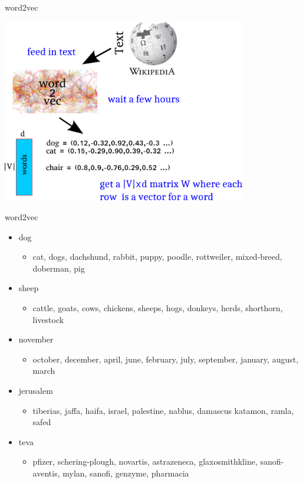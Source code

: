 \documentclass[compress]{beamer}
\begin{document}
\begin{frame}{word2vec}

    \centering
    \includegraphics[width=0.8\textwidth]{distsim/w2v_flow.png}

\end{frame}

\begin{frame}{word2vec}

    \begin{itemize}
        \item dog
            \begin{itemize}
                \item cat, dogs, dachshund, rabbit, puppy, poodle, rottweiler,
                    mixed-breed, doberman, pig
            \end{itemize}
        \item sheep
            \begin{itemize}
                \item cattle, goats, cows, chickens, sheeps, hogs, donkeys,
                    herds, shorthorn, livestock
            \end{itemize}
        \item november
            \begin{itemize}
                \item october, december, april, june, february, july, september,
                    january, august, march
            \end{itemize}
        \item jerusalem
            \begin{itemize}
                \item tiberias, jaffa, haifa, israel, palestine, nablus, damascus
                    katamon, ramla, safed
            \end{itemize}
        \item teva
            \begin{itemize}
                \item pfizer, schering-plough, novartis, astrazeneca,
                    glaxosmithkline, sanofi-aventis, mylan, sanofi, genzyme, pharmacia
            \end{itemize}
    \end{itemize}
\end{frame}
\end{document}

